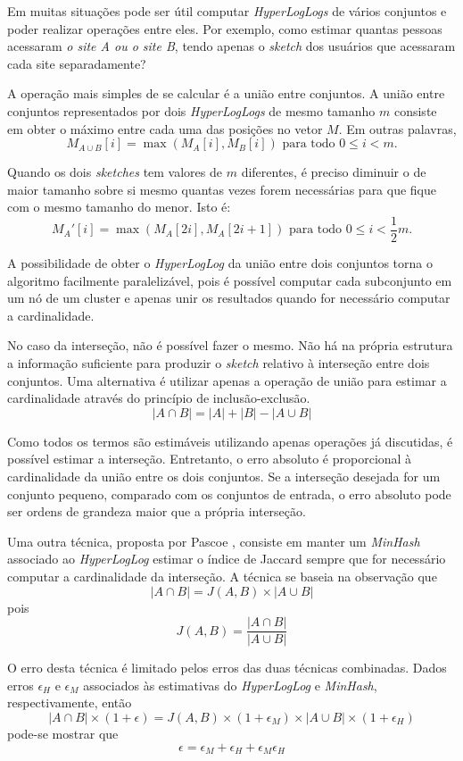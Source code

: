 Em muitas situações pode ser útil computar \emph{HyperLogLogs} de vários conjuntos e poder realizar operações entre eles. Por exemplo, como estimar quantas pessoas acessaram \emph{o site A ou o site B}, tendo apenas o \emph{sketch} dos usuários que acessaram cada site separadamente?

A operação mais simples de se calcular é a união entre conjuntos. A união entre conjuntos representados por dois \emph{HyperLogLogs} de mesmo tamanho $m$ consiste em obter o máximo entre cada uma das posições no vetor $M$. Em outras palavras,
\[
M_{A \cup B}[i] = \max(M_A[i], M_B[i]) \text{ para todo } 0 \leq i < m \text{.}
\]

Quando os dois \emph{sketches} tem valores de $m$ diferentes, é preciso diminuir o de maior tamanho sobre si mesmo quantas vezes forem necessárias para que fique com o mesmo tamanho do menor. Isto é:
\[
M_{A}'[i] = \max(M_A[2i], M_A[2i+1]) \text{ para todo } 0 \leq i < \frac{1}{2}m \text{.}
\]

A possibilidade de obter o \emph{HyperLogLog} da união entre dois conjuntos torna o algoritmo facilmente paralelizável, pois é possível computar cada subconjunto em um nó de um cluster e apenas unir os resultados quando for necessário computar a cardinalidade.

No caso da interseção, não é possível fazer o mesmo. Não há na própria estrutura a informação suficiente para produzir o \emph{sketch} relativo à interseção entre dois conjuntos. Uma alternativa é utilizar apenas a operação de união para estimar a cardinalidade através do princípio de inclusão-exclusão.
\[
|A \cap B| = |A| + |B| - |A \cup B|
\]

Como todos os termos são estimáveis utilizando apenas operações já discutidas, é possível estimar a interseção. Entretanto, o erro absoluto é proporcional à cardinalidade da união entre os dois conjuntos. Se a interseção desejada for um conjunto pequeno, comparado com os conjuntos de entrada, o erro absoluto pode ser ordens de grandeza maior que a própria interseção.

Uma outra técnica, proposta por Pascoe \cite{pascoe2013hllminhash}, consiste em manter um \emph{MinHash} associado ao \emph{HyperLogLog} estimar o índice de Jaccard sempre que for necessário computar a cardinalidade da interseção. A técnica se baseia na observação que
\[
|A \cap B| = J(A, B) \times |A \cup B|
\]
pois
\[
J(A, B) = \frac{|A \cap B|}{|A \cup B|}
\]

O erro desta técnica é limitado pelos erros das duas técnicas combinadas. Dados erros $\epsilon_{H}$ e $\epsilon_{M}$ associados às estimativas do \emph{HyperLogLog} e \emph{MinHash}, respectivamente, então
\[
|A \cap B| \times (1 + \epsilon) = J(A, B) \times (1 + \epsilon_M) \times |A \cup B|  \times (1 + \epsilon_H)
\]
pode-se mostrar que
\[
\epsilon = \epsilon_M + \epsilon_H + \epsilon_M\epsilon_H
\]


